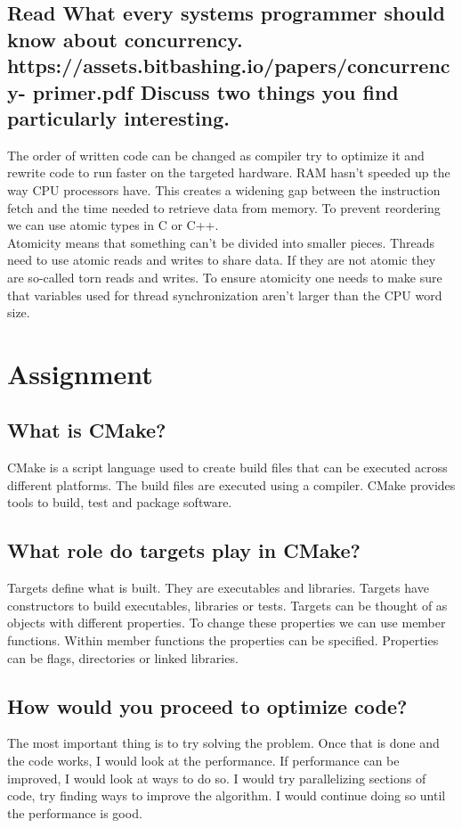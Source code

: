 \documentclass[runningheads]{llncs}
\begin{document}
\subsection{Read What every systems programmer should know about concurrency. https://assets.bitbashing.io/papers/concurrency- primer.pdf
Discuss two things you find particularly interesting.}
The order of written code can be changed as compiler try to optimize it and rewrite code to run faster on the targeted hardware.
RAM hasn’t speeded up the way CPU processors have. This creates a widening gap between the instruction fetch and the time 
needed to retrieve data from memory.
To prevent reordering we can use atomic types in C or C++.
\\
Atomicity means that something can’t be divided into smaller pieces. Threads need to use atomic reads and writes to share data. 
If they are not atomic they are so-called torn reads and writes.
To ensure atomicity one needs to make sure that variables used for thread synchronization aren’t larger than the CPU word size.

\section{Assignment}

\subsection{What is CMake?}
CMake is a script language used to create build files that can be executed across different platforms.
The build files are executed using a compiler. CMake provides tools to build, test and package software.

\subsection{What role do targets play in CMake?}
Targets define what is built. They are executables and libraries.
Targets have constructors to build executables, libraries or tests.
Targets can be thought of as objects with different properties. 
To change these properties we can use member functions.
Within member functions the properties can be specified. 
Properties can be flags, directories or linked libraries.

\subsection{How would you proceed to optimize code?}
The most important thing is to try solving the problem. Once that is done and the code works, I would look at the performance.
If performance can be improved, I would look at ways to do so. I would try parallelizing sections of code, try finding ways to improve the algorithm.
I would continue doing so until the performance is good.
\end{document}
